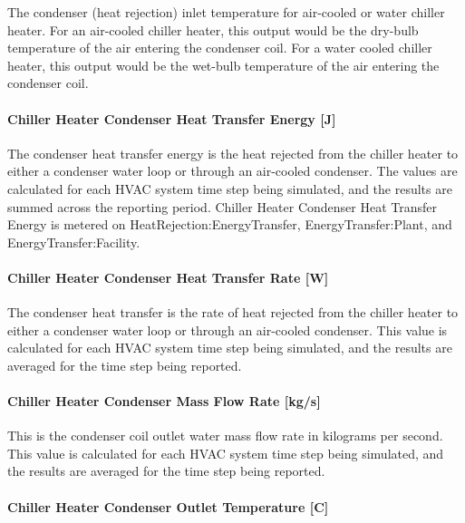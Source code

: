 The condenser (heat rejection) inlet temperature for air-cooled or water chiller heater. For an air-cooled chiller heater, this output would be the dry-bulb temperature of the air entering the condenser coil. For a water cooled chiller heater, this output would be the wet-bulb temperature of the air entering the condenser coil.

\paragraph{Chiller Heater Condenser Heat Transfer Energy {[}J{]}}\label{chiller-heater-condenser-heat-transfer-energy-j}

The condenser heat transfer energy is the heat rejected from the chiller heater to either a condenser water loop or through an air-cooled condenser. The values are calculated for each HVAC system time step being simulated, and the results are summed across the reporting period. Chiller Heater Condenser Heat Transfer Energy is metered on HeatRejection:EnergyTransfer, EnergyTransfer:Plant, and EnergyTransfer:Facility.

\paragraph{Chiller Heater Condenser Heat Transfer Rate {[}W{]}}\label{chiller-heater-condenser-heat-transfer-rate-w}

The condenser heat transfer is the rate of heat rejected from the chiller heater to either a condenser water loop or through an air-cooled condenser. This value is calculated for each HVAC system time step being simulated, and the results are averaged for the time step being reported.

\paragraph{Chiller Heater Condenser Mass Flow Rate {[}kg/s{]}}\label{chiller-heater-condenser-mass-flow-rate-kgs}

This is the condenser coil outlet water mass flow rate in kilograms per second. This value is calculated for each HVAC system time step being simulated, and the results are averaged for the time step being reported.

\paragraph{Chiller Heater Condenser Outlet Temperature {[}C{]}}\label{chiller-heater-condenser-outlet-temperature-c}

